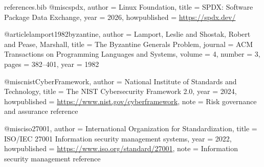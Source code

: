 \begin{filecontents*}{references.bib}
@misc{spdx,
  author       = {{Linux Foundation}},
  title        = {{SPDX: Software Package Data Exchange}},
  year         = {2026},
  howpublished = {\url{https://spdx.dev/}}
}

@article{lamport1982byzantine,
  author  = {Lamport, Leslie and Shostak, Robert and Pease, Marshall},
  title   = {{The Byzantine Generals Problem}},
  journal = {ACM Transactions on Programming Languages and Systems},
  volume  = {4},
  number  = {3},
  pages   = {382--401},
  year    = {1982}
}


@misc{nistCyberFramework,
  author       = {{National Institute of Standards and Technology}},
  title        = {{The NIST Cybersecurity Framework 2.0}},
  year         = {2024},
  howpublished = {\url{https://www.nist.gov/cyberframework}},
  note         = {Risk governance and assurance reference}
}

@misc{iso27001,
  author       = {{International Organization for Standardization}},
  title        = {{ISO/IEC 27001 Information security management systems}},
  year         = {2022},
  howpublished = {\url{https://www.iso.org/standard/27001}},
  note         = {Information security management reference}
}

\end{filecontents*}

\documentclass[11pt]{article}

\usepackage[letterpaper,top=0.72in,bottom=0.82in,left=0.74in,right=0.74in,headheight=22pt,includeheadfoot]{geometry}
\usepackage{fontspec}
\setmainfont{Inter}
\setsansfont{Inter}
\setmonofont{DejaVu Sans Mono}[Scale=0.88]
\usepackage{microtype}
\usepackage{amsmath,amssymb,amsthm,mathtools}
\usepackage{booktabs,tabularx,longtable,array,multirow,makecell}
\usepackage{enumitem}
\usepackage[table]{xcolor}
\usepackage{graphicx}
\usepackage{xurl}
\usepackage{hyperref}
\usepackage[most]{tcolorbox}
\usepackage{tikz}
\usetikzlibrary{arrows.meta,positioning,fit,backgrounds,shapes.geometric,calc,matrix,decorations.pathreplacing}
\usepackage{caption}
\usepackage{subcaption}
\usepackage{listings}
\usepackage{fancyhdr}
\usepackage{titlesec}
\usepackage{lastpage}
\usepackage[backend=biber,style=numeric,sorting=none,natbib=true,maxbibnames=6]{biblatex}

\usepackage{etoolbox}
\usepackage{needspace}
\usepackage{multicol}
\usepackage{ragged2e}


